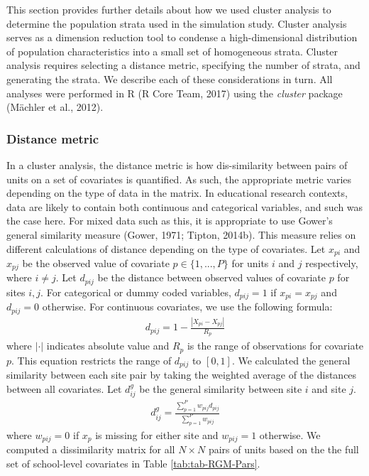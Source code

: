 \documentclass[
  english,
  man,floatsintext]{apa6}
\begin{document}
This section provides further details about how we used cluster analysis to determine the population strata used in the simulation study.
Cluster analysis serves as a dimension reduction tool to condense a high-dimensional distribution of population characteristics into a small set of homogeneous strata. Cluster analysis requires selecting a distance metric, specifying the number of strata, and generating the strata. We describe each of these considerations in turn. All analyses were performed in R (R Core Team, 2017) using the \emph{cluster} package (Mächler et al., 2012).

\hypertarget{distance-metric}{%
\subsubsection{Distance metric}\label{distance-metric}}

In a cluster analysis, the distance metric is how dis-similarity between pairs of units on a set of covariates is quantified. As such, the appropriate metric varies depending on the type of data in the matrix.
In educational research contexts, data are likely to contain both continuous and categorical variables, and such was the case here. For mixed data such as this, it is appropriate to use Gower's general similarity measure (Gower, 1971; Tipton, 2014b). This measure relies on different calculations of distance depending on the type of covariates. Let \(x_{pi}\) and \(x_{pj}\) be the observed value of covariate \(p \in \{1, ..., P\}\) for units \(i\) and \(j\) respectively, where \(i \ne j\). Let \(d_{pij}\) be the distance between observed values of covariate \(p\) for sites \(i,j\). For categorical or dummy coded variables, \(d_{pij} = 1\) if \(x_{pi} = x_{pj}\) and \(d_{pij} = 0\) otherwise. For continuous covariates, we use the following formula:
\begin{align}
\label{eq:gowerdist-p}
d_{pij} = 1 - \frac{|X_{pi} - X_{pj}|}{R_p}
\end{align}
where \(|\cdot|\) indicates absolute value and \(R_p\) is the range of observations for covariate \(p\). This equation restricts the range of \(d_{pij}\) to \([0,1]\). We calculated the general similarity between each site pair by taking the weighted average of the distances between all covariates. Let \(d^{g}_{ij}\) be the general similarity between site \(i\) and site \(j\).
\begin{align}
\label{eq:gowerdist}
d^{g}_{ij} = \frac{\sum^P_{p = 1} w_{pij} d_{pij}}{\sum^P_{p = 1} w_{pij}}
\end{align}
where \(w_{pij} = 0\) if \(x_p\) is missing for either site and \(w_{pij} = 1\) otherwise.
We computed a dissimilarity matrix for all \(N \times N\) pairs of units based on the the full set of school-level covariates in Table \ref{tab:tab-RGM-Pars}.
\end{document}

